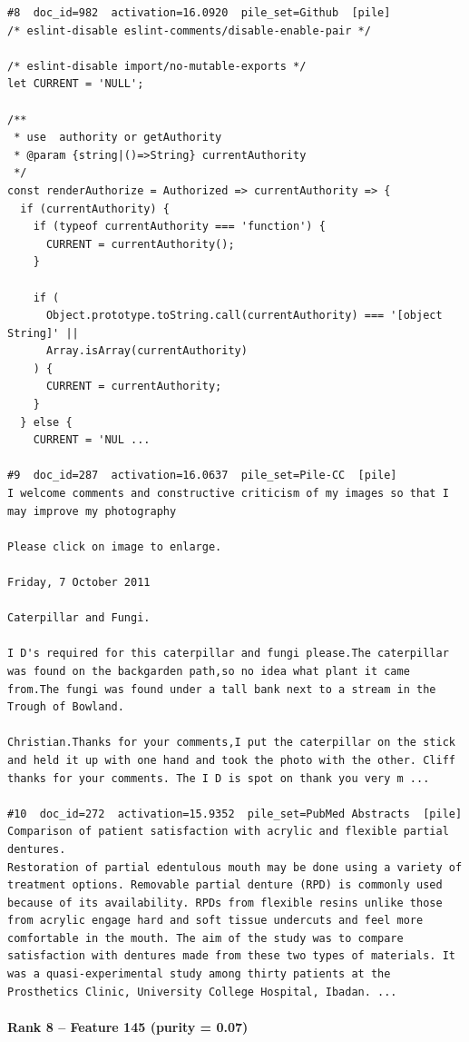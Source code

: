 \begin{verbatim}
#8  doc_id=982  activation=16.0920  pile_set=Github  [pile]
/* eslint-disable eslint-comments/disable-enable-pair */

/* eslint-disable import/no-mutable-exports */
let CURRENT = 'NULL';

/**
 * use  authority or getAuthority
 * @param {string|()=>String} currentAuthority
 */
const renderAuthorize = Authorized => currentAuthority => {
  if (currentAuthority) {
    if (typeof currentAuthority === 'function') {
      CURRENT = currentAuthority();
    }

    if (
      Object.prototype.toString.call(currentAuthority) === '[object String]' ||
      Array.isArray(currentAuthority)
    ) {
      CURRENT = currentAuthority;
    }
  } else {
    CURRENT = 'NUL ...

#9  doc_id=287  activation=16.0637  pile_set=Pile-CC  [pile]
I welcome comments and constructive criticism of my images so that I may improve my photography

Please click on image to enlarge.

Friday, 7 October 2011

Caterpillar and Fungi.

I D's required for this caterpillar and fungi please.The caterpillar was found on the backgarden path,so no idea what plant it came from.The fungi was found under a tall bank next to a stream in the Trough of Bowland.

Christian.Thanks for your comments,I put the caterpillar on the stick and held it up with one hand and took the photo with the other. Cliff thanks for your comments. The I D is spot on thank you very m ...

#10  doc_id=272  activation=15.9352  pile_set=PubMed Abstracts  [pile]
Comparison of patient satisfaction with acrylic and flexible partial dentures.
Restoration of partial edentulous mouth may be done using a variety of treatment options. Removable partial denture (RPD) is commonly used because of its availability. RPDs from flexible resins unlike those from acrylic engage hard and soft tissue undercuts and feel more comfortable in the mouth. The aim of the study was to compare satisfaction with dentures made from these two types of materials. It was a quasi-experimental study among thirty patients at the Prosthetics Clinic, University College Hospital, Ibadan. ...

\end{verbatim}

\paragraph*{Rank 8 -- Feature 145 (purity = 0.07)}

